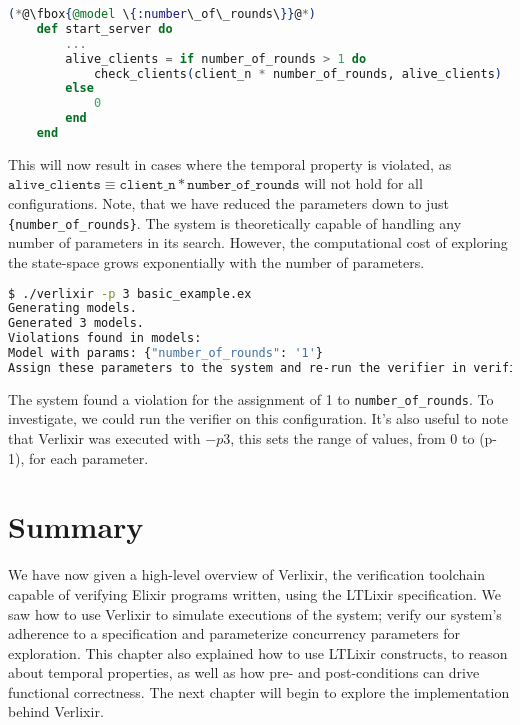 \begin{lstlisting}[language=Elixir, xleftmargin=.1\linewidth]
    (*@\fbox{@model \{:number\_of\_rounds\}}@*)
    def start_server do
        ...
        alive_clients = if number_of_rounds > 1 do
            check_clients(client_n * number_of_rounds, alive_clients)
        else
            0
        end
    end
\end{lstlisting}
This will now result in cases where the temporal property is violated, as $\texttt{alive\_clients} \equiv \texttt{client\_n} * \texttt{number\_of\_rounds}$ will not hold for all configurations. Note, that we have reduced the parameters down to just \texttt{\{number\_of\_rounds\}}. The system is theoretically capable of handling any number of parameters in its search. However, the computational cost of exploring the state-space grows exponentially with the number of parameters.
\begin{lstlisting}[language=bash, xleftmargin=.1\linewidth]
$ ./verlixir -p 3 basic_example.ex
Generating models.
Generated 3 models.
Violations found in models:
Model with params: {"number_of_rounds": '1'}
Assign these parameters to the system and re-run the verifier in verification mode to gather a trace.
\end{lstlisting}
The system found a violation for the assignment of 1 to \texttt{number\_of\_rounds}. To investigate, we could run the verifier on this configuration. It's also useful to note that Verlixir was executed with $-p 3$, this sets the range of values, from 0 to (p-1), for each parameter. 
\section{Summary}
We have now given a high-level overview of Verlixir, the verification toolchain capable of verifying Elixir programs written, using the LTLixir specification. We saw how to use Verlixir to simulate executions of the system; verify our system's adherence to a specification and parameterize concurrency parameters for exploration. This chapter also explained how to use LTLixir constructs, to reason about temporal properties, as well as how pre- and post-conditions can drive functional correctness. The next chapter will begin to explore the implementation behind Verlixir.